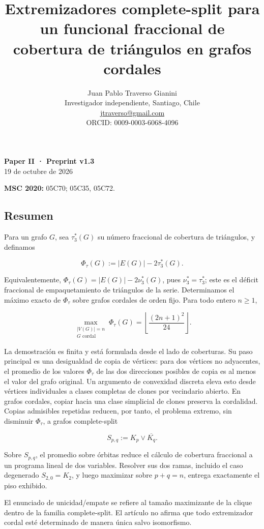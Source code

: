 \documentclass[spanish,11pt,a4paper]{article}
\title{Extremizadores complete-split para un funcional fraccional de cobertura de triángulos en grafos cordales}
\author{Juan Pablo Traverso Gianini\\\small Investigador independiente, Santiago, Chile\\\small \href{mailto:jtraverso@gmail.com}{jtraverso@gmail.com}\\\small ORCID: 0009-0003-6068-4096}
\date{}
\begin{document}
\raggedbottom
\maketitle
\textbf{Paper II · Preprint v1.3}\\
19 de octubre de 2026

\textbf{MSC 2020:} 05C70; 05C35, 05C72.

\subsection{Resumen}\label{resumen}

Para un grafo \(G\), sea \(\tau_3^*(G)\) su número fraccional de
cobertura de triángulos, y definamos

\[
\Phi_\tau(G):=|E(G)|-2\tau_3^*(G).
\]

Equivalentemente, \(\Phi_\tau(G)=|E(G)|-2\nu_3^*(G)\), pues
\(\nu_3^*=\tau_3^*\); este es el déficit fraccional de empaquetamiento
de triángulos de la serie. Determinamos el máximo exacto de
\(\Phi_\tau\) sobre grafos cordales de orden fijo. Para todo entero
\(n\ge1\),

\[
\boxed{
\max_{\substack{|V(G)|=n\\G\text{ cordal}}}
\Phi_\tau(G)
=
\left\lfloor\frac{(2n+1)^2}{24}\right\rfloor
}.
\]

La demostración es finita y está formulada desde el lado de coberturas.
Su paso principal es una desigualdad de copia de vértices: para dos
vértices no adyacentes, el promedio de los valores \(\Phi_\tau\) de las
dos direcciones posibles de copia es al menos el valor del grafo
original. Un argumento de convexidad discreta eleva esto desde vértices
individuales a clases completas de clones por vecindario abierto. En
grafos cordales, copiar hacia una clase simplicial de clones preserva la
cordalidad. Copias admisibles repetidas reducen, por tanto, el problema
extremo, sin disminuir \(\Phi_\tau\), a grafos complete-split

\[
S_{p,q}:=K_p\vee\overline{K_q}.
\]

Sobre \(S_{p,q}\), el promedio sobre órbitas reduce el cálculo de
cobertura fraccional a un programa lineal de dos variables. Resolver sus
dos ramas, incluido el caso degenerado \(S_{2,0}=K_2\), y luego
maximizar sobre \(p+q=n\), entrega exactamente el piso exhibido.

El enunciado de unicidad/empate se refiere al tamaño maximizante de la
clique dentro de la familia complete-split. El artículo no afirma que
todo extremizador cordal esté determinado de manera única salvo
isomorfismo.
\end{document}
